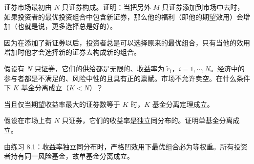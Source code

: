 \begin{problem}
 证券市场最初由 $N$ 只证券构成。证明：当把另外 $M$ 只证券添加到市场中去时，如果投资者的最优投资组合中包含新证券，那么他的福利（即他的期望效用）会增加（也就是说，更多选择总是好的）。
\end{problem}
\begin{solution}
因为在添加了新证券以后，投资者总是可以选择原来的最优组合，只有当他的效用增加时他才会选择新的证券去构成新的组合。
\end{solution}

\begin{problem}
 假设有 $N$ 只证券，它们的供给都是无限的、收益率为 $\tilde{r}_{i}$，$i=1,\cdots,N$。经济中的参与者都是不满足的、风险中性的且具有正的禀赋。市场不允许卖空。在什么条件下 $K$ 基金分离成立（$K<N$）？
\end{problem}
\begin{solution}
当且仅当期望收益率最大的证券数等于 $K$ 时，$K$ 基金分离定理成立。
\end{solution}

\begin{problem}
 假设在市场上有 $N$ 只证券，它们的收益率是独立同分布的。证明单基金分离成立。
\end{problem}
\begin{solution}
由练习 8.1：收益率独立同分布时，严格凹效用下最优组合必为等权重。所有投资者持有同一风险基金，故单基金分离成立。
\end{solution}


